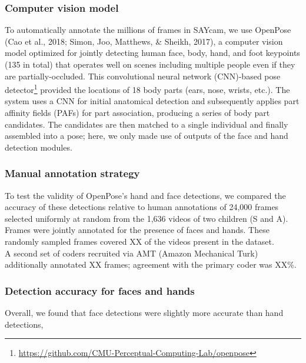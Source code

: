 \documentclass[10pt, letterpaper]{article}
\begin{document}
\hypertarget{computer-vision-model}{%
\subsubsection{Computer vision model}\label{computer-vision-model}}

To automatically annotate the millions of frames in SAYcam, we use
OpenPose (Cao et al., 2018; Simon, Joo, Matthews, \& Sheikh, 2017), a
computer vision model optimized for jointly detecting human face, body,
hand, and foot keypoints (135 in total) that operates well on scenes
including multiple people even if they are partially-occluded. This
convolutional neural network (CNN)-based pose detector\footnote{\url{https://github.com/CMU-Perceptual-Computing-Lab/openpose}}
provided the locations of 18 body parts (ears, nose, wrists, etc.). The
system uses a CNN for initial anatomical detection and subsequently
applies part affinity fields (PAFs) for part association, producing a
series of body part candidates. The candidates are then matched to a
single individual and finally assembled into a pose; here, we only made
use of outputs of the face and hand detection modules.

\hypertarget{manual-annotation-strategy}{%
\subsubsection{Manual annotation
strategy}\label{manual-annotation-strategy}}

To test the validity of OpenPose's hand and face detections, we compared
the accuracy of these detections relative to human annotations of 24,000
frames selected uniformly at random from the 1,636 videos of two
children (S and A). Frames were jointly annotated for the presence of
faces and hands. These randomly sampled frames covered XX of the videos
present in the dataset.\\
A second set of coders recruited via AMT (Amazon Mechanical Turk)
additionally annotated XX frames; agreement with the primary coder was
XX\%.

\hypertarget{detection-accuracy-for-faces-and-hands}{%
\subsubsection{Detection accuracy for faces and
hands}\label{detection-accuracy-for-faces-and-hands}}

Overall, we found that face detections were slightly more accurate than
hand detections,
\end{document}
